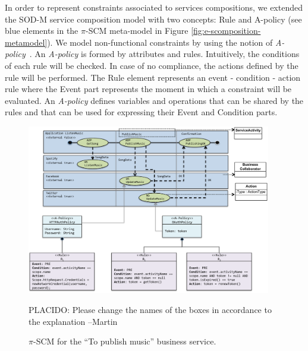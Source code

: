 \begin{itemizedTrivlist}
\item In order to represent constraints associated to services compositions, we extended the SOD-M service composition model with two concepts: {\sc Rule} and {\sc A-policy} (see blue elements in the $\pi$-SCM meta-model in Figure \ref{fig:e-scomposition-metamodel}).
We model non-functional constraints by using the notion of {\em A-policy}~\cite{Espinosa-Oviedo2011a,CIC:eovszmc09c}.
An {\em A-policy} is formed by attributes and rules. 
Intuitively, the conditions of each rule will be checked.
In case of no compliance, the actions defined by the rule will be performed.
The {\sc Rule} element represents an event - condition - action rule where the {\sc Event} part represents the moment in which a constraint  will be evaluated.
An {\em A-policy} defines variables and operations that can be shared by the rules and that can be used for expressing their Event and Condition parts. 
\end{itemizedTrivlist}

\begin{figure}[t]%
\centering
\includegraphics[width=0.95\textwidth]{figs/e-composition-model}

{\color{red}\LARGE PLACIDO: Please change the names of the boxes in accordance to the explanation --Martin}

\caption{$\pi$-SCM for the ``To publish music'' business service.}
\label{fig:servicecompositionmodel}
\end{figure}

